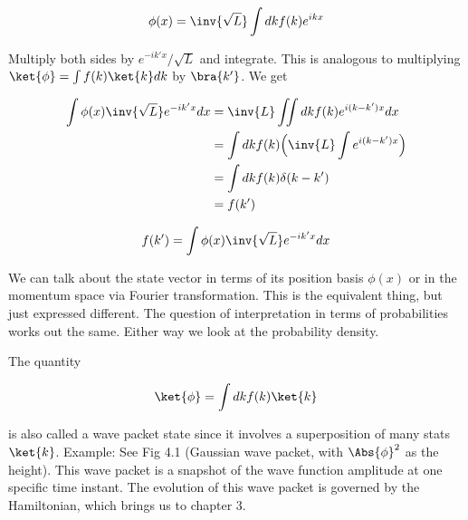 \begin{equation}\label{eqn:lecture5BigReviewCh2Operators:120}
\phi(x)
= \inv{\sqrt{L}} \int dk f(k) e^{ikx}
\end{equation}

Multiply both sides by $e^{-ik'x}/\sqrt{L}$ and integrate.  This is analogous to multiplying $\ket{\phi} = \int f(k) \ket{k} dk$ by $\bra{k'}$.  We get

\begin{equation}\label{eqn:lecture5BigReviewCh2Operators:140}
\begin{aligned}
\int \phi(x) \inv{\sqrt{L}} e^{-ik'x} dx
&= \inv{L} \iint dk f(k) e^{i(k-k')x} dx \\
&= \int dk f(k) \Bigl( \inv{L} \int e^{i(k-k')x} \Bigr) \\
&= \int dk f(k) \delta(k-k') \\
&= f(k')
\end{aligned}
\end{equation}

\begin{equation}\label{eqn:lecture5BigReviewCh2Operators:160}
f(k') = \int \phi(x) \inv{\sqrt{L}} e^{-ik'x} dx
\end{equation}

We can talk about the state vector in terms of its position basis $\phi(x)$ or in the momentum space via Fourier transformation.  This is the equivalent thing, but just expressed different.  The question of interpretation in terms of probabilities works out the same.  Either way we look at the probability density.

The quantity

\begin{equation}\label{eqn:lecture5BigReviewCh2Operators:180}
\ket{\phi} = \int dk f(k) \ket{k}
\end{equation}

is also called a wave packet state since it involves a superposition of many stats $\ket{k}$.  Example: See Fig 4.1 (Gaussian wave packet, with $\Abs{\phi}^2$ as the height).  This wave packet is a snapshot of the wave function amplitude at one specific time instant.  The evolution of this wave packet is governed by the Hamiltonian, which brings us to chapter 3.

